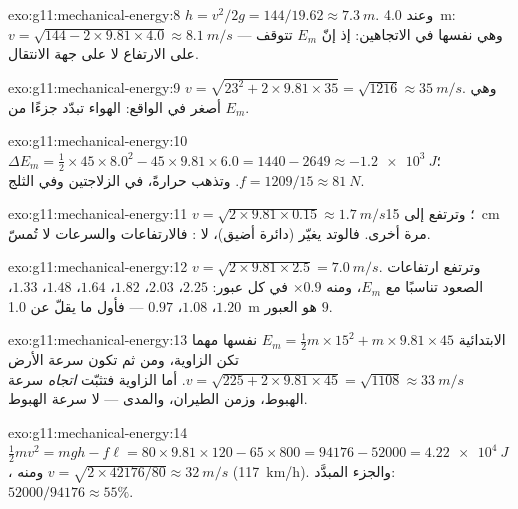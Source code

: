 \begin{solution}{exo:g11:mechanical-energy:8}
$h = v^2/2g = 144/19.62 \approx \qty{7.3}{m}$. وعند \qty{4.0}{m}:
$v = \sqrt{144 - 2 \times 9.81 \times 4.0} \approx \qty{8.1}{m/s}$ ---
وهي نفسها في الاتجاهين: إذ إنّ $E_m$ تتوقف على الارتفاع لا على جهة الانتقال.
\end{solution}

\begin{solution}{exo:g11:mechanical-energy:9}
$v = \sqrt{23^2 + 2 \times 9.81 \times 35} = \sqrt{1216} \approx
\qty{35}{m/s}$. وهي أصغر في الواقع:  الهواء تبدّد جزءًا من
$E_m$.
\end{solution}

\begin{solution}{exo:g11:mechanical-energy:10}
$\Delta E_m = \tfrac12 \times 45 \times 8.0^2 - 45 \times 9.81 \times
6.0 = 1440 - 2649 \approx \qty{-1.2e3}{J}$؛
$f = 1209/15 \approx \qty{81}{N}$. وتذهب حرارةً، في الزلاجتين وفي
الثلج.
\end{solution}

\begin{solution}{exo:g11:mechanical-energy:11}
$v = \sqrt{2 \times 9.81 \times 0.15} \approx \qty{1.7}{m/s}$؛ وترتفع
إلى \qty{15}{cm} مرة أخرى. فالوتد يغيّر  (دائرة أضيق)، لا
: فالارتفاعات والسرعات لا تُمسّ.
\end{solution}

\begin{solution}{exo:g11:mechanical-energy:12}
$v = \sqrt{2 \times 9.81 \times 2.5} = \qty{7.0}{m/s}$. وترتفع ارتفاعات الصعود
تناسبًا مع $E_m$، ومنه $\times 0.9$ في كل عبور: $2.25$، $2.03$، $1.82$،
$1.64$، $1.48$، $1.33$، $1.20$، $1.08$، $0.97$ --- فأول ما يقلّ عن
\qty{1.0}{m} هو العبور $9$.
\end{solution}

\begin{solution}{exo:g11:mechanical-energy:13}
 الابتدائية $E_m = \tfrac12 m \times 15^2 + m \times 9.81 \times 45$ نفسها
مهما تكن الزاوية، ومن ثم تكون سرعة الأرض
$v = \sqrt{225 + 2 \times 9.81 \times 45} = \sqrt{1108} \approx
\qty{33}{m/s}$. أما الزاوية فتثبّت \emph{اتجاه} سرعة
الهبوط، وزمن الطيران، والمدى --- لا سرعة الهبوط.
\end{solution}

\begin{solution}{exo:g11:mechanical-energy:14}
$\tfrac12 mv^2 = mgh - f\ell = 80 \times 9.81 \times 120 - 65 \times
800 = \num{94176} - \num{52000} = \qty{4.22e4}{J}$، ومنه
$v = \sqrt{2 \times \num{42176}/80} \approx \qty{32}{m/s}$
(\qty{117}{km/h}). والجزء المبدَّد: $52000/94176 \approx 55\%$.
\end{solution}

